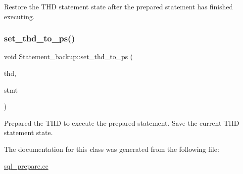 Restore the T\+HD statement state after the prepared statement has finished executing. \mbox{\label{classStatement__backup_ab441c001d75a8692d54fcbd80255c462}} 
\subsubsection{\texorpdfstring{set\+\_\+thd\+\_\+to\+\_\+ps()}{set\_thd\_to\_ps()}}
{\footnotesize\ttfamily void Statement\+\_\+backup\+::set\+\_\+thd\+\_\+to\+\_\+ps (\begin{DoxyParamCaption}\item[{T\+HD $\ast$}]{thd,  }\item[{\mbox{\hyperlink{classPrepared__statement}{Prepared\+\_\+statement}} $\ast$}]{stmt }\end{DoxyParamCaption})\hspace{0.3cm}{\ttfamily [inline]}}

Prepared the T\+HD to execute the prepared statement. Save the current T\+HD statement state. 

The documentation for this class was generated from the following file\+:\begin{DoxyCompactItemize}
\item 
\mbox{\hyperlink{sql__prepare_8cc}{sql\+\_\+prepare.\+cc}}\end{DoxyCompactItemize}

